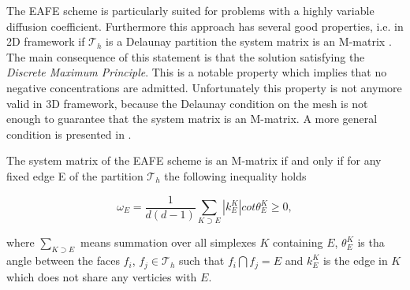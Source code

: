%
%
%
%
%
%


The EAFE scheme is particularly suited for problems with a highly variable diffusion coefficient. Furthermore this approach has several good properties, i.e. in 2D framework if $\mathcal{T}_h$ is a Delaunay partition the system matrix is an M-matrix \cite{BankMmatrixEAFE}. The main consequence of this statement is that the solution satisfying the \textit{Discrete Maximum Principle}. This is a notable property which implies that no negative concentrations are admitted. Unfortunately this property is not anymore valid in 3D framework, because the Delaunay condition on the mesh is not enough to guarantee that the system matrix is an M-matrix. A more general condition is presented in \cite{Zikatanov:EAFE1}.

\begin{Teorema}
The system matrix of the EAFE scheme is an M-matrix if and only if for any fixed edge E of the partition $\mathcal{T}_h$ the following inequality holds

\begin{equation}
\label{eq: mesh delaunay condition}
\omega_E = \dfrac{1}{d(d-1)} \sum_{K\supset E} |k_E^K|cot\theta_E^K \geq 0,
\end{equation}

where $\sum_{K \supset E}$ means summation over all simplexes $K$ containing $E$, $\theta_E^K$ is tha angle between the faces $f_i$, $f_j \in \mathcal{T}_h$ such that $f_i \bigcap f_j = E$  and $k_E^K$ is the edge in $K$ which does not share any verticies with $E$.
\end{Teorema}


